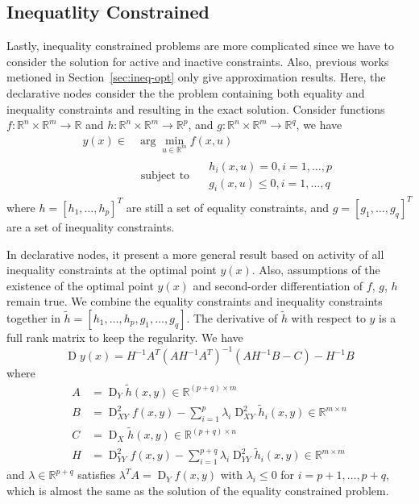 \subsection{Inequatlity Constrained}
Lastly, inequality constrained problems are more complicated since we have to consider the solution for active and inactive constraints. Also, previous works metioned in Section~\ref{sec:ineq-opt} only give approximation results. Here, the declarative nodes consider the the problem containing both equality and inequality constraints and resulting in the exact solution. Consider functions $f: \mathbb{R}^n \times \mathbb{R}^m \rightarrow \mathbb{R}$ and $h: \mathbb{R}^n \times \mathbb{R}^m \rightarrow \mathbb{R}^p$, and $g: \mathbb{R}^n \times \mathbb{R}^m \rightarrow \mathbb{R}^q$, we have
\begin{equation}
    \begin{aligned} 
        y(x) \in & \arg \min _{u \in \mathbb{R}^{m}} f(x, u) \\ & \text { subject to } \quad\begin{array}{l}h_{i}(x, u)=0, i=1, \ldots, p \\ g_{i}(x, u) \leq 0, i=1, \ldots, q\end{array}
    \end{aligned}
\end{equation}
where $h = [h_1, \dots, h_p]^T$ are still a set of equality constraints, and $g = [g_1, \dots, g_q]^T$ are a set of inequality constraints. 
\par In declarative nodes, it present a more general result based on activity of all inequality constraints at the optimal point $y(x)$. Also, assumptions of the existence of the optimal point $y(x)$ and second-order differentiation of $f$, $g$, $h$ remain true. We combine the equality constraints and inequality constraints together in $\tilde{h} = [h_1, \dots, h_p, g_1, \dots, g_q]$. The derivative of $\tilde{h}$ with respect to $y$ is a full rank matrix to keep the regularity. We have
\begin{equation}
    \label{equ:solution-ineq}
    \operatorname{D} y(x)=H^{-1} A^{T}\left(A H^{-1} A^{T}\right)^{-1}\left(A H^{-1} B-C\right)-H^{-1} B
\end{equation}
where
$$
\begin{aligned} 
    A &=\operatorname{D}_{Y} \tilde{h}(x, y) \in \mathbb{R}^{(p+q) \times m} \\ B &=\operatorname{D}_{X Y}^{2} f(x, y)-\sum_{i=1}^{p} \lambda_{i} \operatorname{D}_{X Y}^{2} \tilde{h}_{i}(x, y) \in \mathbb{R}^{m \times n} \\ C &=\operatorname{D}_{X} \tilde{h}(x, y) \in \mathbb{R}^{(p+q) \times n} \\ H &=\operatorname{D}_{Y Y}^{2} f(x, y)-\sum_{i=1}^{p+q} \lambda_{i} \operatorname{D}_{Y Y}^{2} \tilde{h}_{i}(x, y) \in \mathbb{R}^{m \times m} 
\end{aligned}
$$
and $\lambda \in \mathbb{R}^{p+q}$ satisfies $\lambda ^T A = \operatorname{D}_Yf(x,y)$ with $\lambda_i \leq 0$ for $i = p+1, \dots, p+q$, which is almost the same as the solution of the equality constrained problem. 

